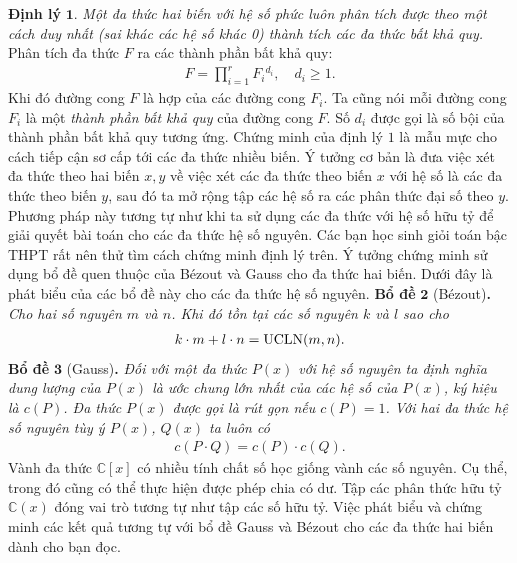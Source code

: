 \begin{multicols}{2}
	\vskip 0.1cm
	\textbf{\color{duongvaotoanhoc}Định lý} $\pmb{1.}$ \textit{Một đa thức hai biến với hệ số phức luôn phân tích được theo một cách duy nhất (sai khác các hệ số khác 0) thành tích các đa thức bất khả quy.}
	\vskip 0.1cm 
	Phân tích đa thức $F$ ra các thành phần bất khả quy:
	\begin{align*}
		F =\prod_{i=1}^r F_i{}^{d_i},\quad d_i\geq 1.
	\end{align*}
	Khi đó đường cong $F$  là hợp của các đường cong $F_i$. Ta cũng nói mỗi đường cong  $F_i$ là một {\em thành phần bất khả quy} của đường cong  $F$. Số $d_i$ được gọi là số bội của thành phần bất khả quy tương ứng. 
	\vskip 0.1cm
	Chứng minh của định lý $1$ là mẫu mực cho cách tiếp cận sơ cấp tới các đa thức nhiều biến. Ý tưởng cơ bản là đưa việc xét đa thức theo hai biến $x,y$ về việc xét các đa thức theo biến $x$ với hệ số là các đa thức theo biến $y$, sau đó ta mở rộng tập các hệ số ra các phân thức đại số theo $y$. Phương pháp này tương tự như khi ta sử dụng các đa thức với hệ số hữu tỷ để giải quyết bài toán cho các đa thức hệ số nguyên. 
	\vskip 0.1cm
	Các bạn học sinh giỏi toán bậc THPT rất nên thử tìm cách chứng minh định lý trên. Ý tưởng chứng minh sử dụng bổ đề quen thuộc của Bézout và  Gauss cho đa thức hai biến. 
	\vskip 0.1cm
	Dưới đây là phát biểu của các bổ đề này cho các đa thức hệ số nguyên. 
	\vskip 0.1cm
	\textbf{\color{duongvaotoanhoc}Bổ đề} $\pmb{2}$ (Bézout)\textbf{\color{duongvaotoanhoc}.} \textit{Cho hai số nguyên $m$ và $n$. Khi đó tồn tại các số nguyên $k$ và $l$ sao cho }
		\begin{align*}
			k\cdot m+l\cdot n=\textrm{\rm UCLN}(m,n).
		\end{align*}
	\vskip 0.1cm
	\textbf{\color{duongvaotoanhoc}Bổ đề} $\pmb{3}$ (Gauss)\textbf{\color{duongvaotoanhoc}.}
	\textit{Đối với một đa thức $P(x)$ với hệ số nguyên ta định nghĩa {\em  dung lượng} của $P(x)$ là ước chung lớn nhất của các hệ số của $P(x)$, ký hiệu là $c(P)$. Đa thức $P(x)$ được gọi là {\em rút gọn} nếu $c(P)=1$. Với hai đa thức hệ số nguyên tùy ý $P(x)$, $Q(x)$ ta luôn có}
	\begin{align*}
		c(P\cdot Q)=c(P)\cdot c(Q).
	\end{align*}
	Vành đa thức $\mathbb C[x]$ có nhiều tính chất số học giống vành các số nguyên. Cụ thể, trong đó cũng có thể thực hiện được phép chia có dư. Tập các phân thức hữu tỷ $\mathbb C(x)$ đóng vai trò tương tự như tập các số hữu tỷ. 
	Việc phát biểu và chứng minh các kết quả tương tự với bổ đề Gauss và Bézout cho các đa thức hai biến dành cho bạn đọc.  
	\vskip 0.1cm	

\end{multicols}
